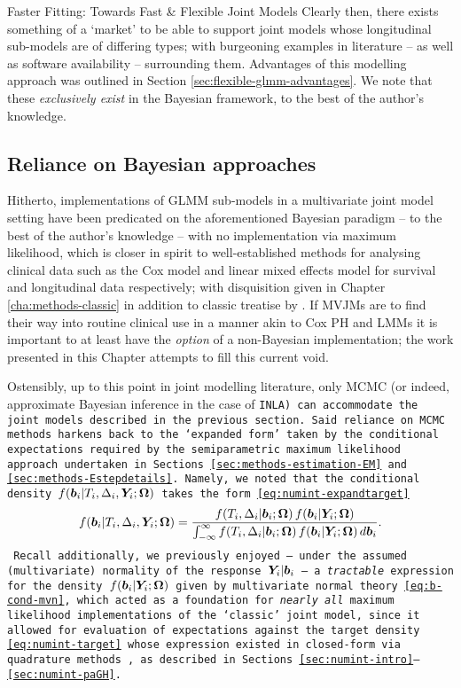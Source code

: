 \begin{chapter}{\label{cha:flexible}Faster Fitting: Towards Fast \& Flexible Joint Models}
Clearly then, there exists something of a `market' to be able to support joint models whose longitudinal sub-models are of differing types; with burgeoning examples in literature -- as well as software availability -- surrounding them. Advantages of this modelling approach was outlined in Section \ref{sec:flexible-glmm-advantages}. We note that these \textit{exclusively exist} in the Bayesian framework, to the best of the author's knowledge.

\subsection{Reliance on Bayesian approaches}\label{sec:flexible-intro-bayes}
Hitherto, implementations of GLMM sub-models in a multivariate joint model setting have been predicated on the aforementioned Bayesian paradigm -- to the best of the author's knowledge -- with no implementation via maximum likelihood, which is closer in spirit to well-established methods for analysing clinical data such as the Cox model and linear mixed effects model for survival and longitudinal data respectively; with disquisition given in Chapter \ref{cha:methods-classic} in addition to classic treatise by \citet{JMOverview}. If MVJMs are to find their way into routine clinical use in a manner akin to Cox PH and LMMs it is important to at least have the \textit{option} of a non-Bayesian implementation; the work presented in this Chapter attempts to fill this current void. 

Ostensibly, up to this point in joint modelling literature, only MCMC (or indeed, approximate Bayesian inference in the case of \tt{INLA}) can accommodate the joint models described in the previous section. Said reliance on MCMC methods harkens back to the `expanded form' taken by the conditional expectations required by the semiparametric maximum likelihood approach undertaken in Sections \ref{sec:methods-estimation-EM} and \ref{sec:methods-Estepdetails}. Namely, we noted that the conditional density $f\!\left(\bm{b}_i|T_i, \Delta_i, \bm{Y}_i; \bm{\mathrm{\Omega}}\right)$ takes the form \eqref{eq:numint-expandtarget}
\begin{equation*}
    f\!\left(\bm{b}_i|T_i, \Delta_i, \bm{Y}_i; \bm{\mathrm{\Omega}}\right)=\frac{f\!\left( T_i,\Delta_i|\bm{b}_i;\bm{\mathrm{\Omega}}\right)f\!\left(\bm{b}_i|\bm{Y}_i;\bm{\mathrm{\Omega}}\right)}{\int_{-\infty}^\infty f\!\left( T_i,\Delta_i|\bm{b}_i;\bm{\mathrm{\Omega}}\right)f\!\left(\bm{b}_i|\bm{Y}_i;\bm{\mathrm{\Omega}}\right) d\bm{b}_i}.
\end{equation*}
Recall additionally, we previously enjoyed -- under the assumed (multivariate) normality of the response $\bm{Y}_i|\bm{b}_i$ -- a \textit{tractable} expression for the density $f\!\left(\bm{b}_i|\bm{Y}_i;\bm{\mathrm{\Omega}}\right)$ given by multivariate normal theory \eqref{eq:b-cond-mvn}, which acted as a foundation for \textit{nearly all} maximum likelihood implementations of the `classic' joint model, since it allowed for evaluation of expectations against the target density \eqref{eq:numint-target} whose expression existed in closed-form via \eg quadrature methods \citep{Wulfsohn97}, as described in Sections \ref{sec:numint-intro}--\ref{sec:numint-paGH}.


\end{chapter}
